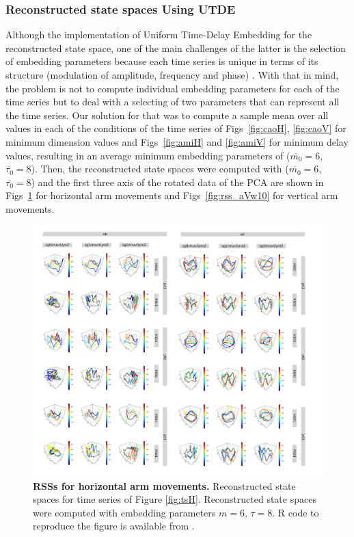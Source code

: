 \subsubsection{Reconstructed state spaces Using UTDE}
Although the implementation of Uniform Time-Delay Embedding for the 
reconstructed state space, one of the main challenges of the latter 
is the selection of embedding parameters because each time series 
is unique in terms of its structure (modulation of amplitude, frequency and phase)
\cite{ frank2010, sama2013, bradley2015}.
With that in mind, the problem is not to compute individual embedding parameters 
for each of the time series but to deal with a selecting of two parameters 
that can represent all the time series. 
Our solution for that was to compute a sample mean over all values in each of the conditions 
of the time series of Figs~\ref{fig:caoH}, \ref{fig:caoV}
for minimum dimension values and Figs~\ref{fig:amiH} and \ref{fig:amiV} for
minimum delay values, resulting in an average minimum embedding parameters 
of ($\overline{m_0}=6$, $\overline{\tau_0}=8$).
Then, the reconstructed state spaces were computed with 
($\overline{m_0}=6$, $\overline{\tau_0}=8$) and 
the first three axis of the rotated data of the PCA are shown in 
Figs~\ref{fig:rss_aHw10} for horizontal arm movements and 
Figs~\ref{fig:rss_aVw10} for vertical arm movements.
\begin{figure}[!h]
\centering
\includegraphics[width=1.0\textwidth]{rss_aH}
\caption{
	{\bf RSSs for horizontal arm movements.}
	Reconstructed state spaces for time series of Figure \ref{fig:tsH}.
	Reconstructed state spaces were computed with 
	embedding parameters $m=6$, $\tau=8$.
	R code to reproduce the figure is available from \cite{hwum2018}.
        }
    \label{fig:rss_aHw10}
\end{figure}

